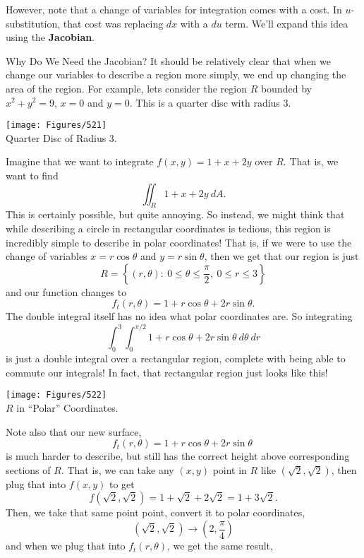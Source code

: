 However, note that a change of variables for integration comes with a cost. In $u$-substitution, that cost was replacing $dx$ with a $du$ term. We'll expand this idea using the \textbf{Jacobian}.

\begin{example}{Why Do We Need the Jacobian?}
It should be relatively clear that when we change our variables to describe a region more simply, we end up changing the area of the region. For example, lets consider the region $R$ bounded by $x^2+y^2=9$, $x=0$ and $y=0$. This is a quarter disc with radius 3.

\vspace{1em}
\begin{center}
\texttt{[image: Figures/521]}\\Quarter Disc of Radius 3.
\end{center}
\vspace{1em}

Imagine that we want to integrate $f(x,y)=1+x+2y$ over $R$. That is, we want to find $$\iint_R 1+x+2y\ dA. $$ This is certainly possible, but quite annoying. So instead, we might think that while describing a circle in rectangular coordinates is tedious, this region is incredibly simple to describe in polar coordinates! That is, if we were to use the change of variables $x=r\cos\theta$ and $y=r\sin\theta$, then we get that our region is just 
$$R=\left\{(r,\theta): \ 0\leq\theta\leq \frac{\pi}{2},\ 0\leq r\leq 3 \right\}$$ 
and our function changes to 
$$f_t(r,\theta)=1+r\cos\theta+2r\sin\theta.$$ 
The double integral itself has no idea what polar coordinates are. So integrating 
$$\int_{0}^{3}\int_{0}^{\pi/2}1+r\cos\theta+2r\sin\theta\ d\theta \ dr $$ 
is just a double integral over a rectangular region, complete with being able to commute our integrals! In fact, that rectangular region just looks like this!

\vspace{1em}
\begin{center}
\texttt{[image: Figures/522]}\\$R$ in ``Polar'' Coordinates.
\end{center}
\vspace{1em}

Note also that our new surface, $$f_t(r,\theta)=1+r\cos\theta+2r\sin\theta\ $$ is much harder to describe, but still has the correct height above corresponding sections of $R$. That is, we can take any $(x,y)$ point in $R$ like $(\sqrt{2},\sqrt{2})$, then plug that into $f(x,y)$ to get 
$$f(\sqrt{2},\sqrt{2})=1+\sqrt{2}+2\sqrt{2}=1+3\sqrt{2}. $$ 
Then, we take that same point point, convert it to polar coordinates, 
$$(\sqrt{2},\sqrt{2})\to\left(2,\frac{\pi}{4}\right) $$ 
and when we plug that into $f_t(r,\theta)$, we get the same result, 


\end{example}
